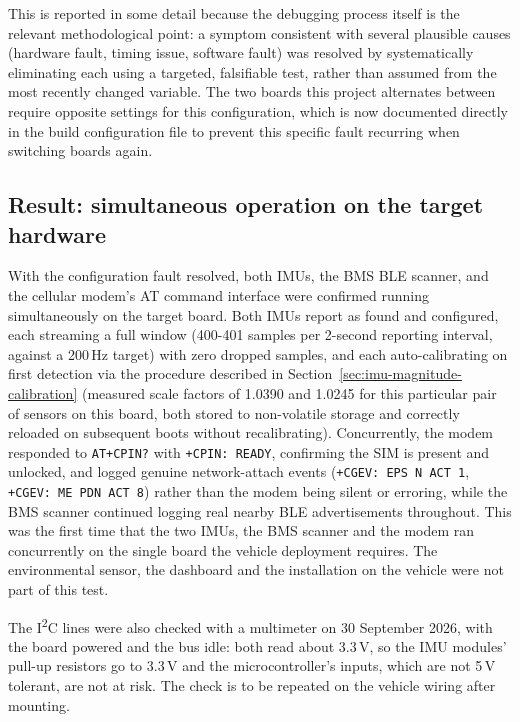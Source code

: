 This is reported in some detail because the debugging process itself is the relevant methodological point: a symptom consistent with several plausible causes (hardware fault, timing issue, software fault) was resolved by systematically eliminating each using a targeted, falsifiable test, rather than assumed from the most recently changed variable. The two boards this project alternates between require opposite settings for this configuration, which is now documented directly in the build configuration file to prevent this specific fault recurring when switching boards again.

\subsection{Result: simultaneous operation on the target hardware}

With the configuration fault resolved, both IMUs, the BMS BLE scanner, and the cellular modem's AT command interface were confirmed running simultaneously on the target board. Both IMUs report as found and configured, each streaming a full window (400-401 samples per 2-second reporting interval, against a 200\,Hz target) with zero dropped samples, and each auto-calibrating on first detection via the procedure described in Section~\ref{sec:imu-magnitude-calibration} (measured scale factors of 1.0390 and 1.0245 for this particular pair of sensors on this board, both stored to non-volatile storage and correctly reloaded on subsequent boots without recalibrating). Concurrently, the modem responded to \texttt{AT+CPIN?} with \texttt{+CPIN: READY}, confirming the SIM is present and unlocked, and logged genuine network-attach events (\texttt{+CGEV: EPS N ACT 1}, \texttt{+CGEV: ME PDN ACT 8}) rather than the modem being silent or erroring, while the BMS scanner continued logging real nearby BLE advertisements throughout. This was the first time that the two IMUs, the BMS scanner and the modem ran concurrently on the single board the vehicle deployment requires. The environmental sensor, the dashboard and the installation on the vehicle were not part of this test.

The I\textsuperscript{2}C lines were also checked with a multimeter on 30 September 2026, with the board powered and the bus idle: both read about 3.3\,V, so the IMU modules' pull-up resistors go to 3.3\,V and the microcontroller's inputs, which are not 5\,V tolerant, are not at risk. The check is to be repeated on the vehicle wiring after mounting.

